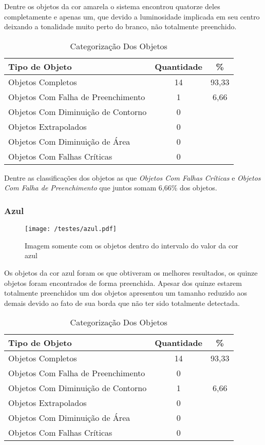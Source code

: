 	Dentre os objetos da cor amarela o sistema encontrou quatorze deles completamente e apenas um, que devido a luminosidade implicada em seu centro deixando a tonalidade muito perto do branco, não totalmente preenchido.
	
	\begin{table}[H]
\centering
\begin{tabular}{l|c|c}
Tipo de Objeto & Quantidade & \%  \\%
\hline                               %
Objetos Completos & 14 & 93,33 \\
\hline 
Objetos Com Falha de Preenchimento & 1 & 6,66 \\
\hline 
Objetos Com Diminuição de Contorno & 0 &\\
\hline 
Objetos Extrapolados & 0 &\\
\hline 
Objetos Com Diminuição de Área &  0 &\\
\hline 
Objetos Com Falhas Críticas & 0 &\\
\hline 
\end{tabular}
\caption{Categorização Dos Objetos}
\end{table}

Dentre as classificações dos objetos as que  \textit{Objetos Com Falhas Críticas} e \textit{Objetos Com Falha de Preenchimento} que juntos somam 6,66\% dos objetos.

\subsubsection{Azul}
	\begin{figure}[H]
		\centering
		\texttt{[image: /testes/azul.pdf]}
		\caption{Imagem somente com os objetos dentro do intervalo do valor da cor azul}
		\label{disposicaoparte}
	\end{figure}

Os objetos da cor azul foram os que obtiveram os melhores resultados, os quinze objetos foram encontrados de forma preenchida.	Apesar dos quinze estarem totalmente preenchidos um dos objetos apresentou um tamanho reduzido aos demais devido ao fato de sua borda que não ter sido totalmente detectada.

\begin{table}[h]
\centering
\begin{tabular}{l|c|c}
Tipo de Objeto & Quantidade & \% \\ %
\hline                               %
Objetos Completos & 14 & 93,33 \\
\hline 
Objetos Com Falha de Preenchimento & 0\\
\hline 
Objetos Com Diminuição de Contorno &  1 & 6,66
\\
\hline 
Objetos Extrapolados &  0\\
\hline 
Objetos Com Diminuição de Área & 0 \\
\hline 
Objetos Com Falhas Críticas & 0 \\
\hline 
\end{tabular}
\caption{Categorização Dos Objetos}
\end{table}

